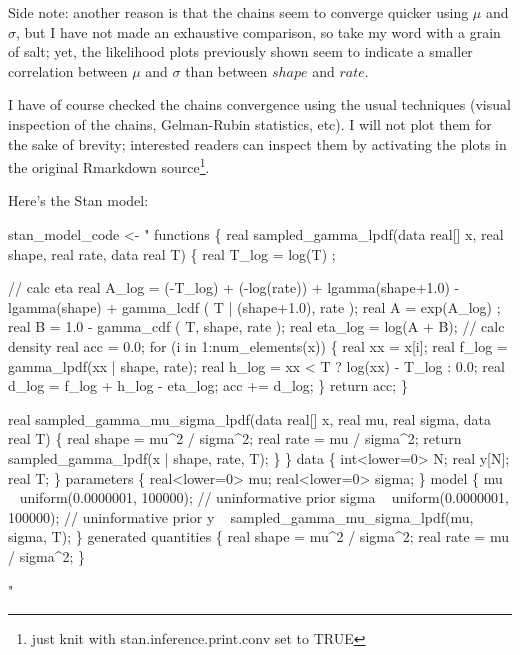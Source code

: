 \documentclass[]{article}
\newenvironment{Shaded}{\begin{snugshade}}{\end{snugshade}}
\newcommand{\NormalTok}[1]{#1}
\newcommand{\StringTok}[1]{\textcolor[rgb]{0.31,0.60,0.02}{#1}}
\begin{document}
Side note: another reason is that the chains seem to converge quicker
using \(\mu\) and \(\sigma\), but I have not made an exhaustive
comparison, so take my word with a grain of salt; yet, the likelihood
plots previously shown seem to indicate a smaller correlation between
\(\mu\) and \(\sigma\) than between \(shape\) and \(rate\).

I have of course checked the chains convergence using the usual
techniques (visual inspection of the chains, Gelman-Rubin statistics,
etc). I will not plot them for the sake of brevity; interested readers
can inspect them by activating the plots in the original Rmarkdown
source\footnote{just knit with stan.inference.print.conv set to TRUE}.

Here's the Stan model:

\begin{Shaded}
\begin{Highlighting}[]
\NormalTok{stan_model_code <-}\StringTok{ "}
\StringTok{functions \{}
\StringTok{  real sampled_gamma_lpdf(data real[] x, real shape, real rate, data real T) \{}
\StringTok{    real T_log = log(T) ;}

\StringTok{    // calc eta}
\StringTok{    real A_log = (-T_log) + }
\StringTok{                 (-log(rate)) + }
\StringTok{                 lgamma(shape+1.0) - lgamma(shape) + gamma_lcdf ( T | (shape+1.0), rate ); }
\StringTok{    real A = exp(A_log) ; }
\StringTok{    real B = 1.0 - gamma_cdf ( T, shape, rate );}
\StringTok{    real eta_log = log(A + B);}
\StringTok{    }
\StringTok{    // calc density}
\StringTok{    real acc = 0.0;}
\StringTok{    for (i in 1:num_elements(x)) \{}
\StringTok{      real xx = x[i];}
\StringTok{      real f_log = gamma_lpdf(xx | shape, rate);}
\StringTok{      real h_log = xx < T ? log(xx) - T_log : 0.0;}
\StringTok{      real d_log = f_log + h_log - eta_log;}
\StringTok{      acc += d_log;}
\StringTok{    \}}
\StringTok{    return acc;}
\StringTok{  \}}

\StringTok{  real sampled_gamma_mu_sigma_lpdf(data real[] x, real mu, real sigma, data real T) \{}
\StringTok{    real shape = mu^2 / sigma^2;}
\StringTok{    real rate  = mu   / sigma^2;}
\StringTok{    return sampled_gamma_lpdf(x | shape, rate, T);}
\StringTok{  \}}
\StringTok{\}}
\StringTok{data \{}
\StringTok{  int<lower=0> N;}
\StringTok{  real y[N]; }
\StringTok{  real T;}
\StringTok{\}}
\StringTok{parameters \{}
\StringTok{  real<lower=0> mu;}
\StringTok{  real<lower=0> sigma;}
\StringTok{\}}
\StringTok{model \{}
\StringTok{  mu    ~ uniform(0.0000001, 100000); // uninformative prior}
\StringTok{  sigma ~ uniform(0.0000001, 100000); // uninformative prior}
\StringTok{  y ~ sampled_gamma_mu_sigma_lpdf(mu, sigma, T);}
\StringTok{\}}
\StringTok{generated quantities \{}
\StringTok{  real shape = mu^2 / sigma^2;}
\StringTok{  real rate  = mu   / sigma^2;}
\StringTok{\}}

\StringTok{"}
\end{Highlighting}
\end{Shaded}
\end{document}
